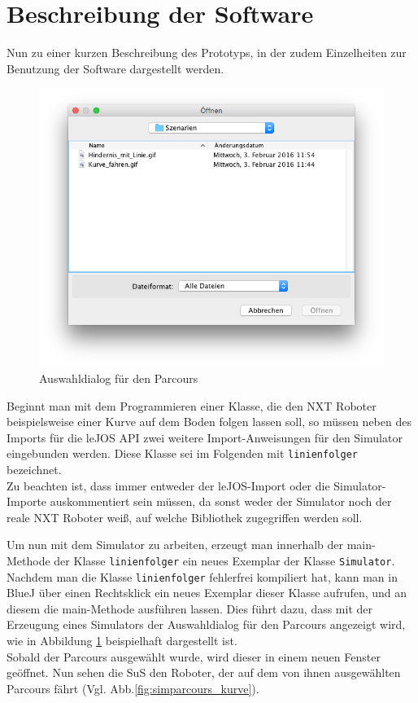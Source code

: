 \documentclass[paper=a4, pagesize, DIV=calc, BCOR=15mm, twoside=on, onecolumn=on, open = right, titlepage =on, parskip =half-, headsepline = on, footsepline = on, chapterprefix = on, appendixprefix = off, fontsize = 12pt, numbers = noenddot, abstract = on]{scrbook}
\numberwithin{equation}{chapter}
\theoremstyle{definition}
\theoremstyle{plain}
\theoremstyle{plain}
\theoremstyle{remark}
\theoremstyle{plain}
\theoremstyle{plain}
\begin{document}
\par \singlespacing
\section{Beschreibung der Software}
\onehalfspacing

Nun zu einer kurzen Beschreibung des Prototyps, in der zudem Einzelheiten zur Benutzung der Software dargestellt werden.



\begin{figure}[H]
\centering
\includegraphics[scale=0.45]{images/dialog_szenarien.png} 
\caption{Auswahldialog für den Parcours}
\label{fig:auswahldialog}
\end{figure}
Beginnt man mit dem Programmieren einer Klasse, die den NXT Roboter beispielsweise einer Kurve auf dem Boden folgen lassen soll, so müssen neben des Imports für die leJOS API zwei weitere Import-Anweisungen für den Simulator eingebunden werden. Diese Klasse sei im Folgenden mit \texttt{linienfolger} bezeichnet.\\
Zu beachten ist, dass immer entweder der leJOS-Import oder die Simulator-Importe auskommentiert sein müssen, da sonst weder der Simulator noch der reale NXT Roboter weiß, auf welche Bibliothek zugegriffen werden soll.

Um nun mit dem Simulator zu arbeiten, erzeugt man innerhalb der main-Methode der Klasse \texttt{linienfolger} ein neues Exemplar der Klasse \texttt{Simulator}. Nachdem man die Klasse \texttt{linienfolger} fehlerfrei kompiliert hat, kann man in BlueJ über einen Rechtsklick ein neues Exemplar dieser Klasse aufrufen, und an diesem die main-Methode ausführen lassen. Dies führt dazu, dass mit der Erzeugung eines Simulators der Auswahldialog für den Parcours angezeigt wird, wie in Abbildung \ref{fig:auswahldialog} beispielhaft dargestellt ist.\\
Sobald der Parcours ausgewählt wurde, wird dieser in einem neuen Fenster geöffnet. Nun sehen die SuS den Roboter, der auf dem von ihnen ausgewählten Parcours fährt (Vgl. Abb.\ref{fig:simparcours_kurve}).
\end{document}
